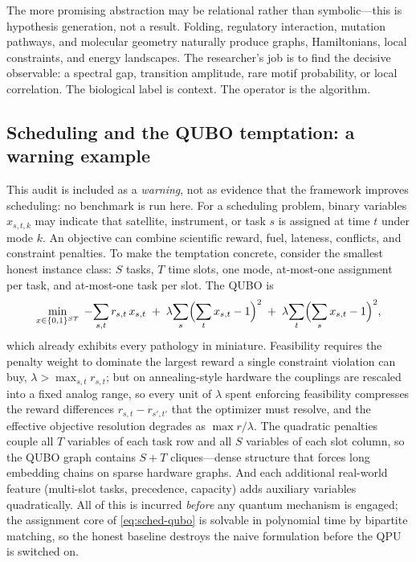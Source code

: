 The more promising abstraction may be relational rather than symbolic---this is hypothesis generation, not a result. Folding, regulatory interaction, mutation pathways, and molecular geometry naturally produce graphs, Hamiltonians, local constraints, and energy landscapes. The researcher's job is to find the decisive observable: a spectral gap, transition amplitude, rare motif probability, or local correlation. The biological label is context. The operator is the algorithm.

\subsection{Scheduling and the QUBO temptation: a warning example}

This audit is included as a \emph{warning}, not as evidence that the framework improves scheduling: no benchmark is run here. For a scheduling problem, binary variables $x_{s,t,k}$ may indicate that satellite, instrument, or task $s$ is assigned at time $t$ under mode $k$. An objective can combine scientific reward, fuel, lateness, conflicts, and constraint penalties. To make the temptation concrete, consider the smallest honest instance class: $S$ tasks, $T$ time slots, one mode, at-most-one assignment per task, and at-most-one task per slot. The QUBO is
\begin{equation}
\min_{x\in\{0,1\}^{ST}}
\;-\!\sum_{s,t} r_{s,t}\,x_{s,t}
\;+\;\lambda\!\sum_{s}\Bigl(\sum_{t}x_{s,t}-1\Bigr)^{2}
\;+\;\lambda\!\sum_{t}\Bigl(\sum_{s}x_{s,t}-1\Bigr)^{2},
\label{eq:sched-qubo}
\end{equation}
which already exhibits every pathology in miniature. Feasibility requires the penalty weight to dominate the largest reward a single constraint violation can buy, $\lambda>\max_{s,t}r_{s,t}$; but on annealing-style hardware the couplings are rescaled into a fixed analog range, so every unit of $\lambda$ spent enforcing feasibility compresses the reward differences $r_{s,t}-r_{s',t'}$ that the optimizer must resolve, and the effective objective resolution degrades as $\max r/\lambda$. The quadratic penalties couple all $T$ variables of each task row and all $S$ variables of each slot column, so the QUBO graph contains $S+T$ cliques---dense structure that forces long embedding chains on sparse hardware graphs. And each additional real-world feature (multi-slot tasks, precedence, capacity) adds auxiliary variables quadratically. All of this is incurred \emph{before} any quantum mechanism is engaged; the assignment core of \cref{eq:sched-qubo} is solvable in polynomial time by bipartite matching, so the honest baseline destroys the naive formulation before the QPU is switched on.

